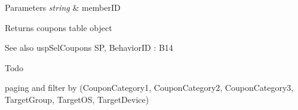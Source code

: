 \begin{DoxyParams}{Parameters}
{\em string} & member\+ID \\
\hline
\end{DoxyParams}
\begin{DoxyReturn}{Returns}
coupons table object 
\end{DoxyReturn}
\begin{DoxySeeAlso}{See also}
usp\+Sel\+Coupons SP, Behavior\+ID \+: B14 
\end{DoxySeeAlso}
\begin{DoxyRefDesc}{Todo}
\item[\hyperlink{a00001__todo000007}{Todo}]paging and filter by (Coupon\+Category1, Coupon\+Category2, Coupon\+Category3, Target\+Group, Target\+OS, Target\+Device) \end{DoxyRefDesc}
